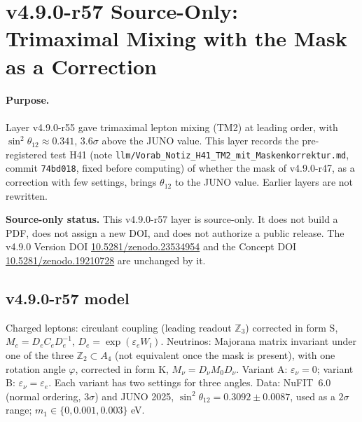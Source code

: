 \clearpage
\section*{v4.9.0-r57 Source-Only: Trimaximal Mixing with the Mask as a Correction}
\label{sec:v490-r57-tm2-correction}

\paragraph{Purpose.}
Layer v4.9.0-r55 gave trimaximal lepton mixing (TM2) at leading order, with \(\sin^2\theta_{12}\approx0.341\), \(3.6\sigma\) above the JUNO value.  This layer records
the pre-registered test H41 (note \texttt{llm/Vorab\_Notiz\_H41\_TM2\_mit\_Maskenkorrektur.md}, commit \texttt{74bd018}, fixed before computing) of whether the mask of
v4.9.0-r47, as a correction with few settings, brings \(\theta_{12}\) to the JUNO value.  Earlier layers are not rewritten.

\noindent\textbf{Source-only status.}
This v4.9.0-r57 layer is source-only.  It does not build a PDF, does not assign a new DOI,
and does not authorize a public release.  The v4.9.0 Version DOI
\href{https://doi.org/10.5281/zenodo.23534954}{10.5281/zenodo.23534954} and the Concept DOI
\href{https://doi.org/10.5281/zenodo.19210728}{10.5281/zenodo.19210728} are unchanged by it.

\subsection*{v4.9.0-r57 model}
\label{subsec:v490-r57-model}

Charged leptons: circulant coupling (leading readout \(\mathbb Z_3\)) corrected in form S, \(M_e=D_eC_eD_e^{-1}\), \(D_e=\exp(\varepsilon_eW_l)\).  Neutrinos: Majorana
matrix invariant under one of the three \(\mathbb Z_2\subset A_4\) (not equivalent once the mask is present), with one rotation angle \(\varphi\), corrected in form K,
\(M_\nu=D_\nu M_0D_\nu\).  Variant A: \(\varepsilon_\nu=0\); variant B: \(\varepsilon_\nu=\varepsilon_e\).  Each variant has two settings for three angles.  Data: NuFIT~6.0
(normal ordering, \(3\sigma\)) and JUNO 2025, \(\sin^2\theta_{12}=0.3092\pm0.0087\), used as a \(2\sigma\) range; \(m_1\in\{0,0.001,0.003\}\) eV.

